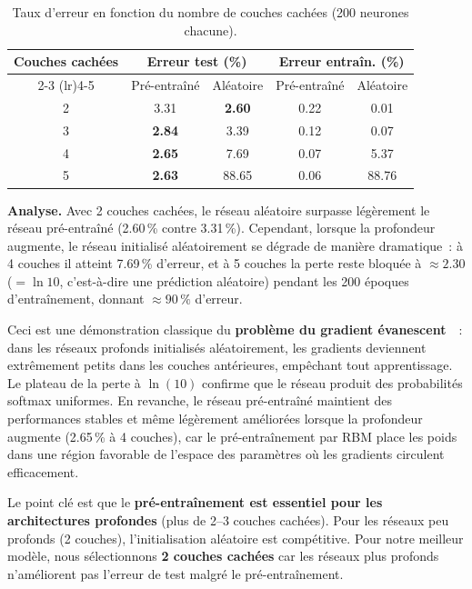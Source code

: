 \documentclass[11pt,a4paper]{article}
\begin{document}
\begin{table}[H]
\centering
\caption{Taux d'erreur en fonction du nombre de couches cach\'ees (200 neurones chacune).}
\label{tab:fig1}
\begin{tabular}{ccccc}
\toprule
Couches cach\'ees & \multicolumn{2}{c}{Erreur test (\%)} & \multicolumn{2}{c}{Erreur entra\^in. (\%)} \\
\cmidrule(lr){2-3} \cmidrule(lr){4-5}
 & Pr\'e-entra\^in\'e & Al\'eatoire & Pr\'e-entra\^in\'e & Al\'eatoire \\
\midrule
2 & 3.31 & \textbf{2.60} & 0.22 & 0.01 \\
3 & \textbf{2.84} & 3.39 & 0.12 & 0.07 \\
4 & \textbf{2.65} & 7.69 & 0.07 & 5.37 \\
5 & \textbf{2.63} & 88.65 & 0.06 & 88.76 \\
\bottomrule
\end{tabular}
\end{table}

\textbf{Analyse.} Avec 2 couches cach\'ees, le r\'eseau al\'eatoire surpasse l\'eg\`erement le r\'eseau pr\'e-entra\^in\'e (2.60\,\% contre 3.31\,\%). Cependant, lorsque la profondeur augmente, le r\'eseau initialis\'e al\'eatoirement se d\'egrade de mani\`ere dramatique~: \`a 4 couches il atteint 7.69\,\% d'erreur, et \`a 5 couches la perte reste bloqu\'ee \`a $\approx 2.30$ ($= \ln 10$, c'est-\`a-dire une pr\'ediction al\'eatoire) pendant les 200 \'epoques d'entra\^inement, donnant $\approx 90\,\%$ d'erreur.

Ceci est une d\'emonstration classique du \textbf{probl\`eme du gradient \'evanescent}~\cite{erhan2010}~: dans les r\'eseaux profonds initialis\'es al\'eatoirement, les gradients deviennent extr\^emement petits dans les couches ant\'erieures, emp\^echant tout apprentissage. Le plateau de la perte \`a $\ln(10)$ confirme que le r\'eseau produit des probabilit\'es softmax uniformes. En revanche, le r\'eseau pr\'e-entra\^in\'e maintient des performances stables et m\^eme l\'eg\`erement am\'elior\'ees lorsque la profondeur augmente (2.65\,\% \`a 4 couches), car le pr\'e-entra\^inement par RBM place les poids dans une r\'egion favorable de l'espace des param\`etres o\`u les gradients circulent efficacement.

Le point cl\'e est que le \textbf{pr\'e-entra\^inement est essentiel pour les architectures profondes} (plus de 2--3 couches cach\'ees). Pour les r\'eseaux peu profonds (2 couches), l'initialisation al\'eatoire est comp\'etitive. Pour notre meilleur mod\`ele, nous s\'electionnons \textbf{2 couches cach\'ees} car les r\'eseaux plus profonds n'am\'eliorent pas l'erreur de test malgr\'e le pr\'e-entra\^inement.
\end{document}
